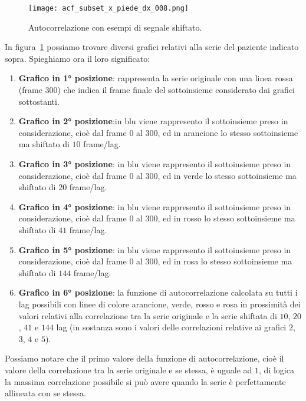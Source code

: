 \begin{figure}[H]
    \centering
    \texttt{[image: acf\_subset\_x\_piede\_dx\_008.png]}
    \caption{Autocorrelazione con esempi di segnale shiftato.}
    \label{fig:acf_subset_x_piede_dx_008}
\end{figure}
In figura~\ref{fig:acf_subset_x_piede_dx_008} possiamo trovare diversi grafici relativi alla
serie del paziente indicato sopra. Spieghiamo ora il loro significato:
\begin{enumerate}
    \item \textbf{Grafico in 1° posizione}: rappresenta la serie originale con una linea rossa (frame $300$)
    che indica il frame finale del sottoinsieme considerato dai grafici sottostanti.
    \item \textbf{Grafico in 2° posizione}:in blu viene rappresento il sottoinsieme preso in considerazione,
    cioè dal frame $0$ al $300$, ed in arancione lo stesso sottoinsieme ma shiftato di $10$ frame/lag.
    \item \textbf{Grafico in 3° posizione}: in blu viene rappresento il sottoinsieme preso in considerazione,
    cioè dal frame $0$ al $300$, ed in verde lo stesso sottoinsieme ma shiftato di $20$ frame/lag.
    \item \textbf{Grafico in 4° posizione}: in blu viene rappresento il sottoinsieme preso in considerazione,
    cioè dal frame $0$ al $300$, ed in rosso lo stesso sottoinsieme ma shiftato di $41$ frame/lag.
    \item \textbf{Grafico in 5° posizione}: in blu viene rappresento il sottoinsieme preso in considerazione,
    cioè dal frame $0$ al $300$, ed in rosa lo stesso sottoinsieme ma shiftato di $144$ frame/lag.
    \item \textbf{Grafico in 6° posizione}: la funzione di autocorrelazione calcolata su tutti i 
    lag possibili con linee di colore arancione, verde, rosso e rosa in prossimità dei valori 
    relativi alla correlazione tra la serie originale e la serie shiftata di $10$, $20$,
    $41$ e $144$ lag (in sostanza sono i valori delle correlazioni relative ai grafici $2$, $3$, $4$ e $5$).
\end{enumerate}

Possiamo notare che il primo valore della funzione di autocorrelazione, cioè il valore della correlazione
tra la serie originale e se stessa, è uguale ad $1$, di logica la massima correlazione possibile si può
avere quando la serie è perfettamente allineata con se stessa.

